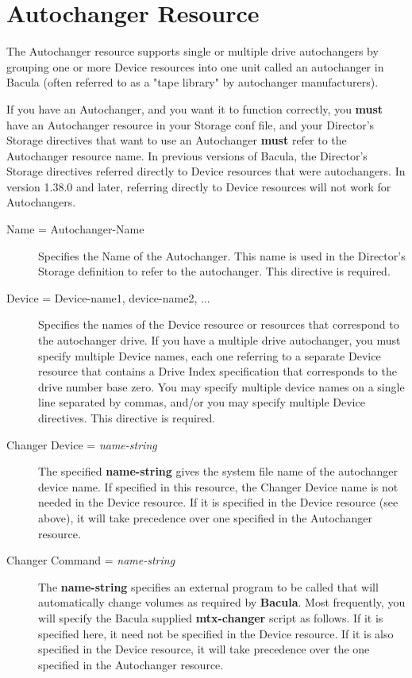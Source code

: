 \chapter{Autochanger Resource}

The Autochanger resource supports single or multiple drive
autochangers by grouping one or more Device resources     
into one unit called an autochanger in Bacula (often referred to
as a "tape library" by autochanger manufacturers).

If you have an Autochanger, and you want it to function correctly,
you {\bf must} have an Autochanger resource in your Storage
conf file, and your Director's Storage directives that want to
use an Autochanger {\bf must} refer to the Autochanger resource name.
In previous versions of Bacula, the Director's Storage directives
referred directly to Device resources that were autochangers.     
In version 1.38.0 and later, referring directly to Device resources
will not work for Autochangers.

\begin{description}
\item [Name = \lt{}Autochanger-Name\gt{}]
   Specifies the Name of the Autochanger.  This name is used in the
   Director's Storage definition to refer to the autochanger.  This
   directive is required.

\item [Device = \lt{}Device-name1, device-name2, ...\gt{}]
   Specifies the names of the Device resource or resources that correspond
   to the autochanger drive.  If you have a multiple drive autochanger, you
   must specify multiple Device names, each one referring to a separate
   Device resource that contains a Drive Index specification that
   corresponds to the drive number base zero.  You may specify multiple
   device names on a single line separated by commas, and/or you may
   specify multiple Device directives.  This directive is required.

\item [Changer Device = {\it name-string}]
   The specified {\bf name-string} gives the system file name of the  autochanger
   device name. If specified in this resource, the Changer Device name
   is not needed in the Device resource. If it is specified in the Device
   resource (see above), it will take precedence over one specified in
   the Autochanger resource.

\item [Changer Command = {\it name-string}]
   The {\bf name-string} specifies an external program to be called  that will
   automatically change volumes as required by {\bf Bacula}.  Most frequently,
   you will specify the Bacula supplied {\bf mtx-changer}  script as follows.
   If it is specified here, it need not be specified in the Device
   resource. If it is also specified in the Device resource, it will take
   precedence over the one specified in the Autochanger resource.

\end{description}

